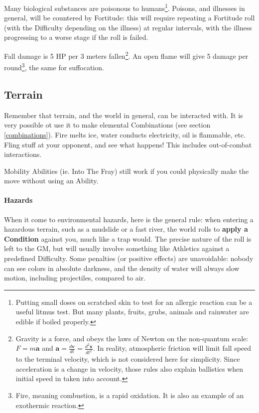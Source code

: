 Many biological substances are poisonous to humans\footnote{Putting small doses on scratched skin to test for an allergic reaction can be a useful litmus test. But many plants, fruits, grubs, animals and rainwater are edible if boiled properly.}. Poisons, and illnesses in general, will be countered by Fortitude: this will require repeating a Fortitude roll (with the Difficulty depending on the illness) at regular intervals, with the illness progressing to a worse stage if the roll is failed.

Fall damage is 5 HP per 3 meters fallen\footnote{Gravity is a force, and obeys the laws of Newton on the non-quantum scale: $F=m\bm{a}$ and $\bm{a} = \frac{d\bm{v}}{dt}=\frac{d^2 \bm{x}}{dt^2}$. In reality, atmospheric friction will limit fall speed to the terminal velocity, which is not considered here for simplicity. Since acceleration is a change in velocity, those rules also explain ballistics when initial speed in taken into account.}. An open flame will give 5 damage per round\footnote{Fire, meaning combustion, is a rapid oxidation. It is also an example of an exothermic reaction.}, the same for suffocation.


\subsection{Terrain}

Remember that terrain, and the world in general, can be interacted with. It is very possible ot use it to make elemental Combinations (see section \ref{combinations}). Fire melts ice, water conducts electricity, oil is flammable, etc. Fling stuff at your opponent, and see what happens! This includes out-of-combat interactions.

Mobility Abilities (ie. Into The Fray) still work if you could physically make the move without using an Ability.

\paragraph{Hazards}

When it come to environmental hazards, here is the general rule: when entering a hazardous terrain, such as a mudslide or a fast river, the world rolls to \textbf{apply a Condition} against you, much like a trap would. The precise nature of the roll is left to the GM, but will usually involve something like Athletics against a predefined Difficulty. Some penalties (or positive effects) are unavoidable: nobody can see colors in absolute darkness, and the density of water will always slow motion, including projectiles, compared to air. 

